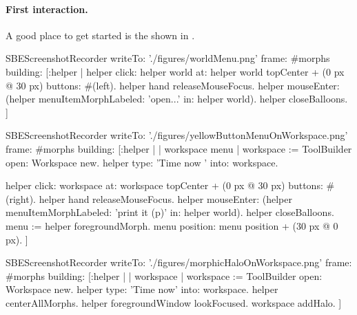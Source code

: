 \documentclass[a4paper,10pt,twoside]{book}
\begin{document}
\paragraph{First interaction.}

A good place to get started is the  shown in .

\begin{ExecuteSmalltalkScript}
SBEScreenshotRecorder writeTo: './figures/worldMenu.png' frame: #morphs building: [:helper |
	helper click: helper world at: helper world topCenter + (0 px @ 30 px) buttons: #(left).
	helper hand releaseMouseFocus.
	helper mouseEnter: (helper menuItemMorphLabeled: 'open...' in: helper world).
	helper closeBalloons.
]
\end{ExecuteSmalltalkScript}

\begin{ExecuteSmalltalkScript}
SBEScreenshotRecorder writeTo: './figures/yellowButtonMenuOnWorkspace.png' frame: #morphs building: [:helper |
	| workspace menu |
	workspace := ToolBuilder open: Workspace new.
	helper type: 'Time now ' into: workspace.

	helper click: workspace at: workspace topCenter + (0 px @ 30 px) buttons: #(right).
	helper hand releaseMouseFocus.
	helper mouseEnter: (helper menuItemMorphLabeled: 'print it (p)' in: helper world).
	helper closeBalloons.
	menu := helper foregroundMorph.
	menu position: menu position + (30 px @ 0 px).
]
\end{ExecuteSmalltalkScript}

\begin{ExecuteSmalltalkScript}
SBEScreenshotRecorder writeTo: './figures/morphicHaloOnWorkspace.png' frame: #morphs building: [:helper | | workspace |
	workspace := ToolBuilder open: Workspace new.
	helper type: 'Time now' into: workspace.
	helper centerAllMorphs.
	helper foregroundWindow lookFocused.
	workspace addHalo.
]
\end{ExecuteSmalltalkScript}
\end{document}

